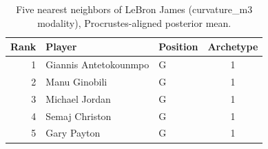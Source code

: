 \begin{table}[htbp]
  \centering\small
  \begin{tabular}{rllc}
    \toprule
    Rank & Player & Position & Archetype \\
    \midrule
    1 & Giannis Antetokounmpo & G & 1 \\
    2 & Manu Ginobili & G & 1 \\
    3 & Michael Jordan & G & 1 \\
    4 & Semaj Christon & G & 1 \\
    5 & Gary Payton & G & 1 \\
    \bottomrule
  \end{tabular}
  \caption{Five nearest neighbors of LeBron James (curvature_m3 modality), Procrustes-aligned posterior mean.}
  \label{tab:LeBron_James_neighbors_curvature_m3}
\end{table}

